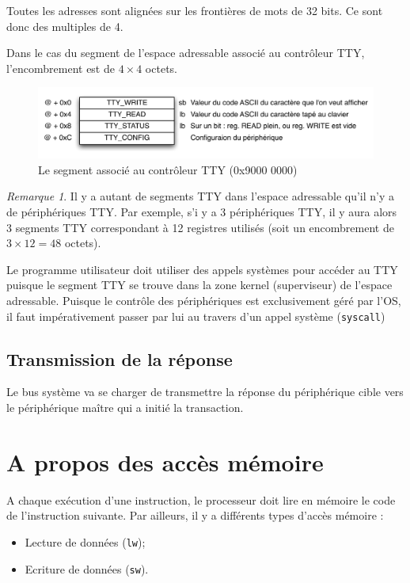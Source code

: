 \documentclass[11pt,english,french]{scrreprt}
\theoremstyle{remark}
\newtheorem*{rem*}{Remarque}
\theoremstyle{definition}
\begin{document}
Toutes les adresses sont alignées sur les frontières de mots de 32 bits. Ce sont donc des multiples de 4.

Dans le cas du segment de l'espace adressable associé au contrôleur TTY, l'encombrement est de $4\times 4$ octets.
\begin{figure}[!h]
	\center
	\includegraphics[scale=.75]{diagrammes/TTY}
	\caption{Le segment associé au contrôleur TTY (0x9000 0000)}
\end{figure}

\begin{rem*}
	Il y a autant de segments TTY dans l'espace adressable qu'il n'y a de périphériques TTY. Par exemple, s'i y a 3 périphériques TTY, il y aura alors 3 segments TTY correspondant à 12 registres utilisés (soit un encombrement de $3\times 12=48$ octets). 
\end{rem*}

Le programme utilisateur doit utiliser des appels systèmes pour accéder au TTY puisque le segment TTY se trouve dans la zone kernel (superviseur) de l'espace adressable. Puisque le contrôle des périphériques est exclusivement géré par l'OS, il faut impérativement passer par lui au travers d'un appel système (\lstinline!syscall!)

\subsection*{Transmission de la réponse} %
Le bus système va se charger de transmettre la réponse du périphérique cible vers le périphérique maître qui a initié la transaction.

\section{A propos des accès mémoire} %

A chaque exécution d'une instruction, le processeur doit lire en mémoire le code de l'instruction suivante. Par ailleurs, il y a différents types d'accès mémoire :\begin{itemize}
	\item Lecture de données (\lstinline!lw!);
	\item Ecriture de données (\lstinline!sw!).
\end{itemize}
\end{document}
